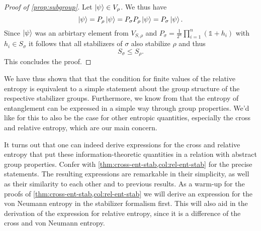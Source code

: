 \begin{proof}[Proof of \cref{prop:subgroup}]
  Let $\ket{\psi} \in V_\rho$. We thus have
  \[
    \ket{\psi} = P_\rho \ket{\psi} = P_\sigma P_\rho \ket{\psi} = P_\sigma
    \ket{\psi}.
  \]
  Since $\ket{\psi}$ was an arbirtary element from $V_{S,\rho}$ and $P_\sigma =
  \frac{1}{2^n} \prod_{i=1}^n \left(\mathds{1} + h_i\right)$ with $h_i \in
  S_\sigma$ it follows that all stabilizers of $\sigma$ also stabilize $\rho$
  and thus
  \[
    S_\sigma \leq S_\rho.
  \]
  This concludes the proof.
\end{proof}
We have thus shown that that the condition for finite values of the relative
entropy is equivalent to a simple statement about the group structure of the
respective stabilizer groups. Furthermore, we know from 
\cite{fattalEntanglementStabilizerFormalism2004} that the entropy of
entanglement can be expressed in a simple way through group properties.
We'd like for this to also be the case for other entropic quantities,
especially the cross and relative entropy, which are our main concern.

It turns out that one can indeed derive expressions for the cross and relative
entropy that put these information-theoretic quantities in a relation with
abstract group properties. Confer with
\cref{thm:cross-ent-stab,col:rel-ent-stab} for the precise statements. The
resulting expressions are remarkable in their simplicity, as well as their
similarity to each other and to previous results. As a warm-up for the proofs
of \cref{thm:cross-ent-stab,col:rel-ent-stab} we will derive an expression for
the von Neumann entropy in the stabilizer formalism first. This will also aid
in the derivation of the expression for relative entropy, since it is a
difference of the cross and von Neumann entropy.

